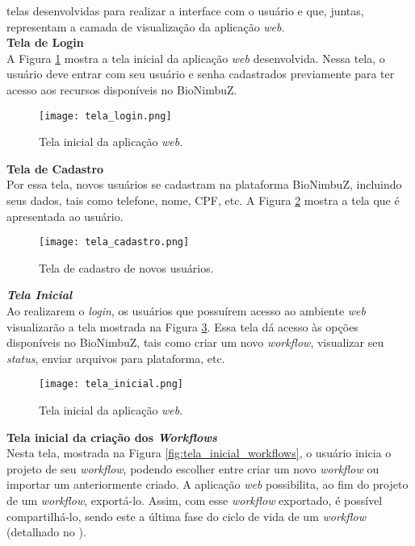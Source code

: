 telas desenvolvidas para realizar a interface com o usuário e que, juntas, representam a camada de visualização da aplicação \textit{web}. \\

\noindent
\textbf{Tela de Login} \\

\noindent
A Figura \ref{fig:tela_login} mostra a tela inicial da aplicação \textit{web} desenvolvida. Nessa tela, o usuário deve entrar com seu usuário e senha cadastrados previamente para ter acesso aos recursos disponíveis no BioNimbuZ.

\begin{figure}[H]
	\centering
	\texttt{[image: tela\_login.png]}
	\caption{Tela inicial da aplicação \textit{web}.}
	\label{fig:tela_login}
\end{figure}

\noindent
\textbf{Tela de Cadastro} \\

\noindent
Por essa tela, novos usuários se cadastram na plataforma BioNimbuZ, incluindo seus dados, tais como telefone, nome, CPF, etc. A Figura \ref{fig:tela_cadastro} mostra a tela que é apresentada ao usuário.

\begin{figure}[H]
	\centering
	\texttt{[image: tela\_cadastro.png]}
	\caption{Tela de cadastro de novos usuários.}
	\label{fig:tela_cadastro}
\end{figure}

\noindent
\textbf{\textit{Tela Inicial}} \\

\noindent
Ao realizarem o \textit{login}, os usuários que possuírem acesso ao ambiente \textit{web} visualizarão a tela mostrada na Figura \ref{fig:tela_inicial}. Essa tela dá acesso às opções disponíveis no BioNimbuZ, tais como criar um novo \textit{workflow}, visualizar seu \textit{status}, enviar arquivos para plataforma, etc.

\begin{figure}[H]
	\centering
	\texttt{[image: tela\_inicial.png]}
	\caption{Tela inicial da aplicação \textit{web}.}
	\label{fig:tela_inicial}
\end{figure}

\noindent
\textbf{Tela inicial da criação dos \textit{Workflows}} \\

\noindent
Nesta tela, mostrada na Figura \ref{fig:tela_inicial_workflows}, o usuário inicia o projeto de seu \textit{workflow}, podendo escolher entre criar um novo \textit{workflow} ou importar um anteriormente criado. A aplicação \textit{web} possibilita, ao fim do projeto de um \textit{workflow}, exportá-lo. Assim, com esse \textit{workflow} exportado, é possível compartilhá-lo, sendo este a última fase do ciclo de vida de um \textit{workflow} (detalhado no ).

